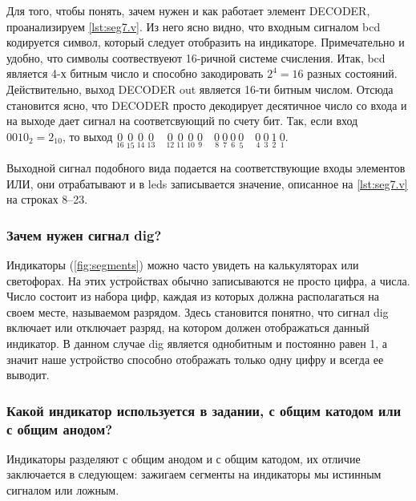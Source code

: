Для того, чтобы понять, зачем нужен и как работает элемент DECODER, проанализируем \cref{lst:seg7.v}. Из него ясно видно, что входным сигналом bcd кодируется символ, который следует отобразить на индикаторе. Примечательно и удобно, что символы соотвествуеют 16-ричной системе счисления. Итак, bcd является 4-х битным число и способно закодировать $2^4=16$ разных состояний. Действительно, выход DECODER out является 16-ти битным числом. Отсюда становится ясно, что DECODER просто декодирует десятичное число со входа и на выходе дает сигнал на соответсвующий по счету бит. Так, если вход $0010_2=2_{10}$, то выход
$
\underset{\scriptscriptstyle 16}{0} ~
\underset{\scriptscriptstyle 15}{0} ~
\underset{\scriptscriptstyle 14}{0} ~
\underset{\scriptscriptstyle 13}{0} \quad
\underset{\scriptscriptstyle 12}{0} ~
\underset{\scriptscriptstyle 11}{0} ~
\underset{\scriptscriptstyle 10}{0} ~
\underset{\scriptscriptstyle 9}{0} \quad
\underset{\scriptscriptstyle 8}{0} ~
\underset{\scriptscriptstyle 7}{0} ~
\underset{\scriptscriptstyle 6}{0} ~
\underset{\scriptscriptstyle 5}{0} \quad
\underset{\scriptscriptstyle 4}{0} ~
\underset{\scriptscriptstyle 3}{0} ~
\underset{\scriptscriptstyle 2}{1} ~
\underset{\scriptscriptstyle 1}{0}
$.

Выходной сигнал подобного вида подается на соответствующие входы элементов ИЛИ, они отрабатывают и в leds записывается значение, описанное на \cref{lst:seg7.v} на строках 8--23.

\subsubsection*{Зачем нужен сигнал dig?}
Индикаторы (\cref{fig:segments}) можно часто увидеть на калькуляторах или светофорах. На этих устройствах обычно записываются не просто цифра, а числа. Число состоит из набора цифр, каждая из которых должна располагаться на своем месте, называемом разрядом. Здесь становится понятно, что сигнал dig включает или отключает разряд, на котором должен отображаться данный индикатор. В данном случае dig является однобитным и постоянно равен 1, а значит наше устройство способно отображать только одну цифру и всегда ее выводит.

\subsubsection*{Какой индикатор используется в задании, с общим катодом или с общим анодом?}
Индикаторы разделяют с общим анодом и с общим катодом, их отличие заключается в следующем: зажигаем сегменты на индикаторы мы истинным сигналом или ложным. 

